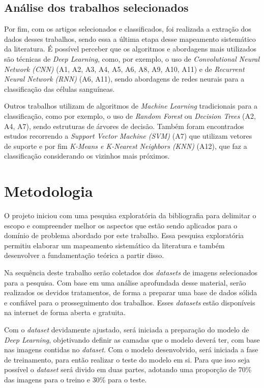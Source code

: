 \section{Análise dos trabalhos selecionados}

Por fim, com os artigos selecionados e classificados, foi realizada a extração dos dados desses trabalhos, sendo essa a última etapa desse mapeamento sistemático da literatura. É possível perceber que os algoritmos e abordagens mais utilizados são técnicas de \emph{Deep Learning}, como, por exemplo, o uso de \emph{Convolutional Neural Network (CNN)} (A1, A2, A3, A4, A5, A6, A8, A9, A10, A11) e de \emph{Recurrent Neural Network (RNN)} (A6, A11), sendo abordagens de redes neurais para a classificação das células sanguíneas.

Outros trabalhos utilizam de algoritmos de \emph{Machine Learning} tradicionais para a classificação, como por exemplo, o uso de \emph{Random Forest} ou \emph{Decision Trees}  (A2, A4, A7), sendo estruturas de árvores de decisão. Também foram encontrados estudos recorrendo a \emph{Support Vector Machine (SVM)} (A7) que utilizam vetores de suporte e por fim \emph{K-Means e K-Nearest Neighbors (KNN)} (A12), que faz a classificação considerando os vizinhos mais próximos.

\chapter{Metodologia}
\label{chap:metodologia}

O projeto iniciou com uma pesquisa exploratória da bibliografia para delimitar o escopo e compreender melhor os aspectos que estão sendo aplicados para o domínio de problema abordado por este trabalho. Essa pesquisa exploratória permitiu elaborar um mapeamento sistemático da literatura e também desenvolver a fundamentação teórica a partir disso.

Na sequência deste trabalho serão coletados dos \emph{datasets} de imagens selecionados para a pesquisa. Com base em uma análise aprofundada desse material, serão realizados os devidos tratamentos, de forma a preparar uma base de dados sólida e confiável para o prosseguimento dos trabalhos. Esses \emph{datasets} estão disponíveis na internet de forma aberta e gratuita.

Com o \emph{dataset} devidamente ajustado, será iniciada a preparação do modelo de \emph{Deep Learning}, objetivando definir as camadas que o modelo deverá ter, com base nas imagens contidas no \emph{dataset}. Com o modelo desenvolvido, será iniciada a fase de treinamento, para então realizar o teste do modelo em si. Para que isso seja possível o \emph{dataset} será divido em duas partes, adotando uma proporção de 70\% das imagens para o treino e 30\% para o teste.

